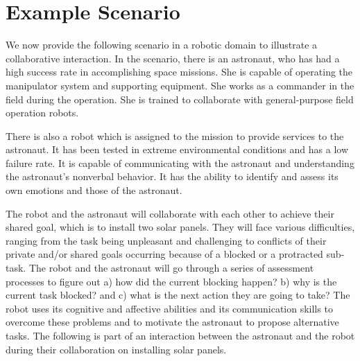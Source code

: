 \documentclass[12pt]{report}
\begin{document}
\section{Example Scenario}
\label{sec:example-scenario}
We now provide the following scenario in a robotic domain to illustrate a
collaborative interaction. In the scenario, there is an astronaut, who has had a
high success rate in accomplishing space missions. She is capable of operating
the manipulator system and supporting equipment. She works as a commander in the
field during the operation. She is trained to collaborate with general-purpose
field operation robots.

There is also a robot which is assigned to the mission to provide services to
the astronaut. It has been tested in extreme environmental conditions and has
a low failure rate. It is capable of communicating with the astronaut and
understanding the astronaut's nonverbal behavior. It has the ability to identify
and assess its own emotions and those of the astronaut.

The robot and the astronaut will collaborate with each other to achieve their
shared goal, which is to install two solar panels. They will face various
difficulties, ranging from the task being unpleasant and challenging to
conflicts of their private and/or shared goals occurring because of a blocked or
a protracted sub-task. The robot and the astronaut will go through a series of
assessment processes to figure out a) how did the current blocking happen? b)
why is the current task blocked? and c) what is the next action they are going
to take? The robot uses its cognitive and affective abilities and its
communication skills to overcome these problems and to motivate the astronaut to
propose alternative tasks. The following is part of an interaction between the
astronaut and the robot during their collaboration on installing solar panels.
\end{document}
